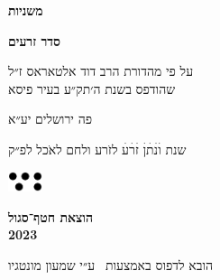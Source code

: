 \documentclass[14pt, a5paper, twoside, extrafontsizes]{memoir}
\begin{document}
\frontmatter
\pagestyle{myheadings}
\thispagestyle{mytitlepage}
\begin{hebrew}
{\Centering  

  {\huge\bfseries משניות}
  
  {\LARGE\bfseries סדר זרעים}

  \vspace{1em}

  \vspace{0.5em}
  על פי מהדורת הרב דוד אלטאראס ז״ל\\שהודפס בשנת ה׳תק״ע בעיר פיסא

    \vspace{8em}
    פה {\LARGE ירושלים} יע״א

    {\small שנת}
    {\Large וׄנׄתׄןׄ זׄרׄעׄ}
    לזֹרע ולחם לאֹכל
    {\small לפ״ק}
    
    \vspace{2em}
  \includegraphics[width=10mm]{hatafSegolLogoNoText.png}\\
  
    \vspace{.5em}
  {
    \bfseries הוצאת חטף־סגול\\2023
    
 {\footnotesize  הובא לדפוס באמצעות \XeLaTeX\ ע״י שמעון מונטגיו}

  }
    
}




\vspace{2em}

\mainmatter
\thispagestyle{empty}















\tractatehead{~}{~} %
\end{hebrew}
\end{document}

